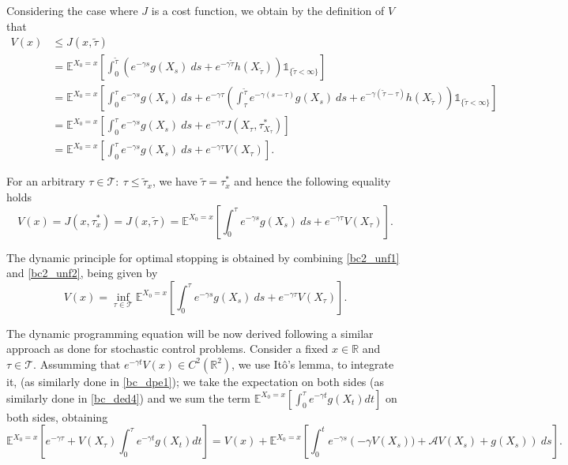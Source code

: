 Considering the case where $J$ is a cost function, we obtain by the definition of $V$ that
\begin{align}
V(x)&\leq J(x,\tilde{\tau}) \nonumber  \\
&= \mathds{E}^{X_0=x}\left[ \int^{\tilde{\tau}}_0 \left(e^{-\gamma s} g(X_s) \ ds +e^{-\gamma \tilde{\tau}}h(X_{\tilde{\tau}}) 
\right) \mathds{1}_{ \{\tilde{\tau}< \infty \}} \right] \nonumber \\
&= \mathds{E}^{X_0=x} \left[ \int^\tau_0 e^{-\gamma s} g(X_s) \ ds +e^{-\gamma \tau} \left( \int^{\tilde{\tau}}_\tau e^{-\gamma (s-\tau)} g(X_s) \ ds + e^{-\gamma (\tilde{\tau}-\tau)} h(X_{\tilde{\tau}} )  \right) 
\mathds{1}_{ \{\tilde{\tau}< \infty \}} 
\right] \nonumber \\
&=  \mathds{E}^{X_0=x}\left[ \int^{\tau}_0 e^{-\gamma s} g(X_s) \ ds +e^{-\gamma \tau} J(X_\tau,\tau^*_{X_\tau}) \right] \nonumber \\
&= \mathds{E}^{X_0=x}\left[ \int^{\tau}_0 e^{-\gamma s} g(X_s) \ ds +e^{-\gamma \tau}V(X_\tau) \right].
 \label{bc2_unf1}
\end{align}

For an arbitrary $\tau\in \mathcal{T}: \ \tau \leq \tilde{\tau}_x$, we have $\tilde{\tau}=\tau_x^*$ and hence the following equality holds
\begin{equation}
V(x)=J(x,\tau_x^*)=J(x,\tilde{\tau})=\mathds{E}^{X_0=x}\left[ \int^{\tau}_0 e^{-\gamma s} g(X_s) \ ds +e^{-\gamma \tau}V(X_\tau) \right].
	\label{bc2_unf2}
\end{equation}

The dynamic principle for optimal stopping is obtained by combining \eqref{bc2_unf1} and \eqref{bc2_unf2}, being given by
\begin{equation}
V(x)=\inf_{\tau \in \mathcal{T}} \mathds{E}^{X_0=x}\left[ \int^{\tau}_0 e^{-\gamma s} g(X_s) \ ds +e^{-\gamma \tau}V(X_\tau) \right].
	\label{bc2_dpp}
\end{equation}

The dynamic programming equation will be now derived following a similar approach as done for stochastic control problems. Consider a fixed $x \in \mathds{R}$ and $\tau \in \mathcal{T}$. Assumming that $e^{-\gamma t} V(x) \in C^2(\mathds{R}^2)$, we use Itô's lemma, to integrate it, (as similarly done in \eqref{bc_dpe1}); we take the expectation on both sides (as similarly done in \eqref{bc_ded4}) and we sum the term $\mathds{E}^{X_0=x}\left[ \int^\tau_0 e^{-\gamma t}g(X_t)dt \right]$ on both sides, obtaining 
\begin{equation}
\mathds{E}^{X_0=x} \left[e^{-\gamma \tau} + V(X_\tau) \int^\tau_0 e^{-\gamma t}g(X_t)dt \right]=
V(x)+\mathds{E}^{X_0=x} \left[ \int^t_0  e^{-\gamma s} \left( - \gamma V(X_s))+\mathcal{A}V(X_s)+g(X_s) \right) \ ds \right].
\label{bc2_unf3}
\end{equation}

